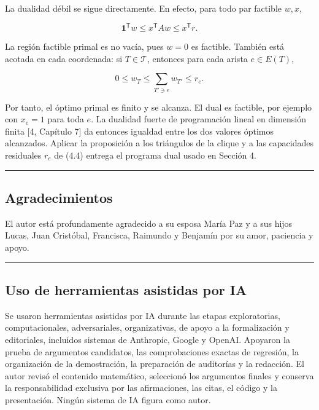 \documentclass[spanish,11pt,a4paper]{article}
\begin{document}
La dualidad débil se sigue directamente. En efecto, para todo par
factible \(w,x\),

\[
\mathbf 1^{\mathsf T}w
\le
x^{\mathsf T}Aw
\le
x^{\mathsf T}r.
\]

La región factible primal es no vacía, pues \(w=0\) es factible. También
está acotada en cada coordenada: si \(T\in\mathcal T\), entonces para
cada arista \(e\in E(T)\),

\[
0\le w_T\le\sum_{T'\ni e}w_{T'}\le r_e.
\]

Por tanto, el óptimo primal es finito y se alcanza. El dual es factible,
por ejemplo con \(x_e=1\) para toda \(e\). La dualidad fuerte de
programación lineal en dimensión finita {[}4, Capítulo 7{]} da entonces
igualdad entre los dos valores óptimos alcanzados. Aplicar la
proposición a los triángulos de la clique y a las capacidades residuales
\(r_e\) de (4.4) entrega el programa dual usado en Sección 4.

\begin{center}\rule{0.5\linewidth}{0.5pt}\end{center}

\subsection{Agradecimientos}\label{agradecimientos}

El autor está profundamente agradecido a su esposa María Paz y a sus
hijos Lucas, Juan Cristóbal, Francisca, Raimundo y Benjamín por su amor,
paciencia y apoyo.

\begin{center}\rule{0.5\linewidth}{0.5pt}\end{center}

\subsection{Uso de herramientas asistidas por
IA}\label{uso-de-herramientas-asistidas-por-ia}

Se usaron herramientas asistidas por IA durante las etapas
exploratorias, computacionales, adversariales, organizativas, de apoyo a
la formalización y editoriales, incluidos sistemas de Anthropic, Google
y OpenAI. Apoyaron la prueba de argumentos candidatos, las
comprobaciones exactas de regresión, la organización de la demostración,
la preparación de auditorías y la redacción. El autor revisó el
contenido matemático, seleccionó los argumentos finales y conserva la
responsabilidad exclusiva por las afirmaciones, las citas, el código y
la presentación. Ningún sistema de IA figura como autor.
\end{document}
